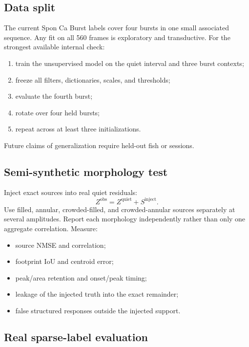 \documentclass[11pt]{article}
\begin{document}
\subsection{Data split}

The current Spon Ca Burst labels cover four bursts in one small associated
sequence. Any fit on all 560 frames is exploratory and transductive. For the
strongest available internal check:
\begin{enumerate}[leftmargin=*]
\item train the unsupervised model on the quiet interval and three burst
contexts;
\item freeze all filters, dictionaries, scales, and thresholds;
\item evaluate the fourth burst;
\item rotate over four held bursts;
\item repeat across at least three initializations.
\end{enumerate}
Future claims of generalization require held-out fish or sessions.

\subsection{Semi-synthetic morphology test}

Inject exact sources into real quiet residuals:
\begin{equation}
Z^{\mathrm{obs}}=Z^{\mathrm{quiet}}+S^{\mathrm{inject}}.
\end{equation}
Use filled, annular, crowded-filled, and crowded-annular sources separately at
several amplitudes. Report each morphology independently rather than only one
aggregate correlation. Measure:
\begin{itemize}[leftmargin=*]
\item source NMSE and correlation;
\item footprint IoU and centroid error;
\item peak/area retention and onset/peak timing;
\item leakage of the injected truth into the exact remainder;
\item false structured responses outside the injected support.
\end{itemize}

\subsection{Real sparse-label evaluation}
\end{document}
